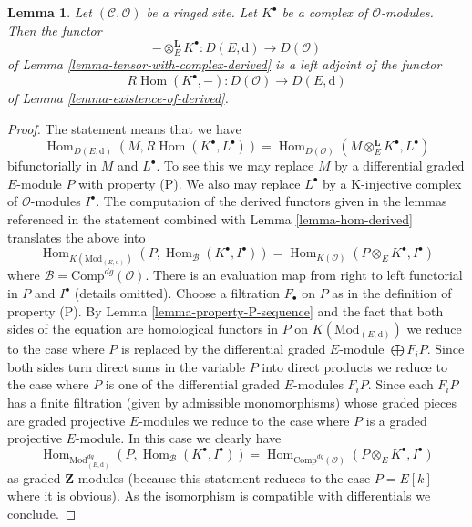 \documentclass{stacks-project}
\theoremstyle{plain}
\newtheorem{lemma}[subsection]{Lemma}
\theoremstyle{definition}
\theoremstyle{remark}
\numberwithin{equation}{subsection}
\def\Hom{\mathop{\mathrm{Hom}}\nolimits}
\begin{document}
\begin{lemma}
\label{lemma-tensor-with-complex-hom-adjoint}
Let $(\mathcal{C}, \mathcal{O})$ be a ringed site.
Let $K^\bullet$ be a complex of $\mathcal{O}$-modules.
Then the functor
$$
- \otimes_E^\mathbf{L} K^\bullet :
D(E, \text{d})
\longrightarrow
D(\mathcal{O})
$$
of Lemma \ref{lemma-tensor-with-complex-derived} is a left adjoint
of the functor
$$
R\Hom(K^\bullet, -) : D(\mathcal{O}) \longrightarrow D(E, \text{d})
$$
of Lemma \ref{lemma-existence-of-derived}.
\end{lemma}

\begin{proof}
The statement means that we have
$$
\Hom_{D(E, \text{d})}(M, R\Hom(K^\bullet, L^\bullet)) =
\Hom_{D(\mathcal{O})}(M \otimes^\mathbf{L}_E K^\bullet, L^\bullet)
$$
bifunctorially in $M$ and $L^\bullet$. To see this we may replace $M$
by a differential graded $E$-module $P$ with property (P).
We also may replace $L^\bullet$ by a K-injective complex of
$\mathcal{O}$-modules $I^\bullet$. The computation
of the derived functors given in the lemmas referenced in the statement
combined with Lemma \ref{lemma-hom-derived} translates the above into
$$
\Hom_{K(\text{Mod}_{(E, \text{d})})}
(P, \Hom_\mathcal{B}(K^\bullet, I^\bullet)) =
\Hom_{K(\mathcal{O})}(P \otimes_E K^\bullet, I^\bullet)
$$
where $\mathcal{B} = \text{Comp}^{dg}(\mathcal{O})$. 
There is an evaluation map from right to left functorial
in $P$ and $I^\bullet$ (details omitted).
Choose a filtration $F_\bullet$ on $P$ as in the definition of property (P).
By Lemma \ref{lemma-property-P-sequence} and the fact that
both sides of the equation are homological functors in $P$
on $K(\text{Mod}_{(E, \text{d})})$
we reduce to the case where $P$ is replaced by
the differential graded $E$-module $\bigoplus F_iP$.
Since both sides turn direct sums in the variable $P$
into direct products we reduce to the case where $P$ is one of the
differential graded $E$-modules $F_iP$.
Since each $F_iP$ has a finite filtration (given by admissible
monomorphisms) whose graded pieces are graded projective $E$-modules
we reduce to the case where $P$ is a graded projective $E$-module.
In this case we clearly have
$$
\Hom_{\text{Mod}^{dg}_{(E, \text{d})}}
(P, \Hom_\mathcal{B}(K^\bullet, I^\bullet)) =
\Hom_{\text{Comp}^{dg}(\mathcal{O})}(P \otimes_E K^\bullet, I^\bullet)
$$
as graded $\mathbf{Z}$-modules (because this statement reduces to the case
$P = E[k]$ where it is obvious). As the isomorphism is compatible with
differentials we conclude.
\end{proof}
\end{document}
